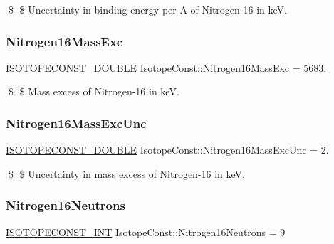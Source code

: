 \$ \$ Uncertainty in binding energy per A of Nitrogen-\/16 in keV. \mbox{\label{group___isotope_const-_nitrogen-_n16_ga6fcc41e9ec8ed0be4a8ad16f5bf1fb31}} 
\subsubsection{\texorpdfstring{Nitrogen16\+Mass\+Exc}{Nitrogen16MassExc}}
{\footnotesize\ttfamily \mbox{\hyperlink{group___isotope_const-_macros_ga8f45a7272ce02c0b4c65c44636ed719a}{I\+S\+O\+T\+O\+P\+E\+C\+O\+N\+S\+T\+\_\+\+D\+O\+U\+B\+LE}} Isotope\+Const\+::\+Nitrogen16\+Mass\+Exc = 5683.}

\$ \$ Mass excess of Nitrogen-\/16 in keV. \mbox{\label{group___isotope_const-_nitrogen-_n16_ga9a78aef1ba1922ec21f2b36e34452d99}} 
\subsubsection{\texorpdfstring{Nitrogen16\+Mass\+Exc\+Unc}{Nitrogen16MassExcUnc}}
{\footnotesize\ttfamily \mbox{\hyperlink{group___isotope_const-_macros_ga8f45a7272ce02c0b4c65c44636ed719a}{I\+S\+O\+T\+O\+P\+E\+C\+O\+N\+S\+T\+\_\+\+D\+O\+U\+B\+LE}} Isotope\+Const\+::\+Nitrogen16\+Mass\+Exc\+Unc = 2.}

\$ \$ Uncertainty in mass excess of Nitrogen-\/16 in keV. \mbox{\label{group___isotope_const-_nitrogen-_n16_ga45bfa0f05e86acd8a2eba17f4a76db3f}} 
\subsubsection{\texorpdfstring{Nitrogen16\+Neutrons}{Nitrogen16Neutrons}}
{\footnotesize\ttfamily \mbox{\hyperlink{group___isotope_const-_macros_ga5f18360b3e99483a35c32d789e62621c}{I\+S\+O\+T\+O\+P\+E\+C\+O\+N\+S\+T\+\_\+\+I\+NT}} Isotope\+Const\+::\+Nitrogen16\+Neutrons = 9}

